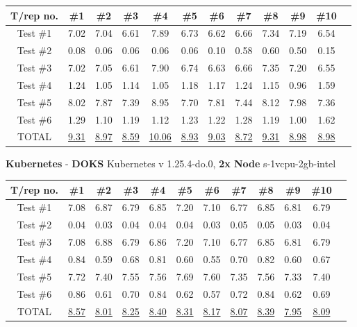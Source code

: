 \begin{tabular}{ |c|c|c|c|c|c|c|c|c|c|c|c| } 
    \hline
    T/rep no. & \#1 & \#2& \#3& \#4& \#5& \#6& \#7& \#8& \#9& \#10 \\
    \hline
    Test \#1 & 7.02 & 7.04& 6.61& 7.89& 6.73& 6.62& 6.66& 7.34& 7.19& 6.54 \\ 
    Test \#2 & 0.08 & 0.06& 0.06& 0.06& 0.06& 0.10& 0.58& 0.60& 0.50& 0.15 \\ 
    Test \#3 & 7.02 & 7.05& 6.61& 7.90& 6.74& 6.63& 6.66& 7.35& 7.20& 6.55 \\ 
    Test \#4 & 1.24 & 1.05& 1.14& 1.05& 1.18& 1.17& 1.24& 1.15& 0.96& 1.59 \\ 
    Test \#5 & 8.02 & 7.87& 7.39& 8.95& 7.70& 7.81& 7.44& 8.12& 7.98& 7.36 \\ 
    Test \#6 & 1.29 & 1.10& 1.19& 1.12& 1.23& 1.22& 1.28& 1.19& 1.00& 1.62 \\ 
    TOTAL & \underline{9.31} & \underline{8.97}& \underline{8.59}&\underline{10.06}& \underline{8.93}& \underline{9.03}& \underline{8.72}& \underline{9.31}& \underline{8.98}& \underline{8.98} \\ 
    \hline
\end{tabular}
\newline
\textbf{Kubernetes} - \textbf{DOKS} Kubernetes v 1.25.4-do.0, \textbf{2x Node} s-1vcpu-2gb-intel
\newline
\begin{tabular}{ |c|c|c|c|c|c|c|c|c|c|c|c| } 
    \hline
    T/rep no. & \#1 & \#2& \#3& \#4& \#5& \#6& \#7& \#8& \#9& \#10 \\
    \hline
    Test \#1 & 7.08 & 6.87& 6.79& 6.85& 7.20& 7.10& 6.77& 6.85& 6.81& 6.79 \\ 
    Test \#2 & 0.04 & 0.03& 0.04& 0.04& 0.04& 0.03& 0.05& 0.05& 0.03& 0.04 \\ 
    Test \#3 & 7.08 & 6.88& 6.79& 6.86& 7.20& 7.10& 6.77& 6.85& 6.81& 6.79 \\ 
    Test \#4 & 0.84 & 0.59& 0.68& 0.81& 0.60& 0.55& 0.70& 0.82& 0.60& 0.67 \\ 
    Test \#5 & 7.72 & 7.40& 7.55& 7.56& 7.69& 7.60& 7.35& 7.56& 7.33& 7.40 \\ 
    Test \#6 & 0.86 & 0.61& 0.70& 0.84& 0.62& 0.57& 0.72& 0.84& 0.62& 0.69 \\ 
    TOTAL & \underline{8.57} & \underline{8.01}& \underline{8.25}& \underline{8.40}& \underline{8.31}& \underline{8.17}& \underline{8.07}& \underline{8.39}& \underline{7.95}& \underline{8.09} \\ 
    \hline
\end{tabular}
